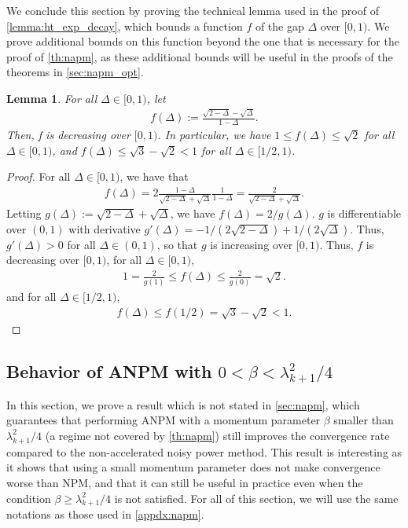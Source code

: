 \documentclass{article}
\theoremstyle{plain}
\newtheorem{lemma}[theorem]{Lemma}
\theoremstyle{definition}
\theoremstyle{remark}
\begin{document}
We conclude this section by proving the technical lemma used in the proof of \cref{lemma:ht_exp_decay}, which bounds a function $f$ of the gap $\Delta$ over $[0,1)$. We prove additional bounds on this function beyond the one that is necessary for the proof of \cref{th:napm}, as these additional bounds will be useful in the proofs of the theorems in \cref{sec:napm_opt}.

\begin{lemma}\label{lemma:f_delta_bounds}
  For all $\Delta \in [0,1)$, let
  \begin{align*}
    f(\Delta) := \frac{\sqrt{2-\Delta} - \sqrt{\Delta}}{1 - \Delta}.
  \end{align*}
  Then, f is decreasing over $[0,1)$. In particular, we have $1 \leqslant f(\Delta) \leqslant \sqrt{2}$ for all $\Delta \in [0,1)$, and $f(\Delta) \leqslant \sqrt{3} - \sqrt{2} < 1$ for all $\Delta \in [1/2, 1)$.
\end{lemma}

\begin{proof}
  For all $\Delta \in [0,1)$, we have that
  \begin{align*}
    f(\Delta) = 2 \frac{1-\Delta}{\sqrt{2-\Delta} + \sqrt{\Delta}} \frac{1}{1-\Delta} = \frac{2}{\sqrt{2-\Delta} + \sqrt{\Delta}}.
  \end{align*}
  Letting $g(\Delta) := \sqrt{2-\Delta} + \sqrt{\Delta}$, we have $f(\Delta) = 2/g(\Delta)$. $g$ is differentiable over $(0,1)$ with derivative $g'(\Delta) = -1/(2\sqrt{2-\Delta}) + 1/(2\sqrt{\Delta})$. Thus, $g'(\Delta) > 0$ for all $\Delta \in (0,1)$, so that $g$ is increasing over $[0,1)$. Thus, $f$ is decreasing over $[0,1)$, for all $\Delta \in [0,1)$, 
  \begin{align*}
    1 = \frac{2}{g(1)} \leqslant f(\Delta) \leqslant \frac{2}{g(0)} = \sqrt{2}.
  \end{align*}
  and for all $\Delta \in [1/2, 1)$,
  \begin{align*}
    f(\Delta) \leqslant f(1/2) = \sqrt{3} - \sqrt{2} < 1.
  \end{align*}
\end{proof}

\subsection{Behavior of ANPM with $0 <\beta < \lambda_{k+1}^2/4$}\label{apdx:anpm_beta_small}

In this section, we prove a result which is not stated in \cref{sec:napm}, which guarantees that performing ANPM with a momentum parameter $\beta$ smaller than $\lambda_{k+1}^2/4$ (a regime not covered by \cref{th:napm}) still improves the convergence rate compared to the non-accelerated noisy power method. This result is interesting as it shows that using a small momentum parameter does not make convergence worse than NPM, and that it can still be useful in practice even when the condition $\beta \geqslant \lambda_{k+1}^2/4$ is not satisfied. For all of this section, we will use the same notations as those used in \cref{appdx:napm}.
\end{document}

